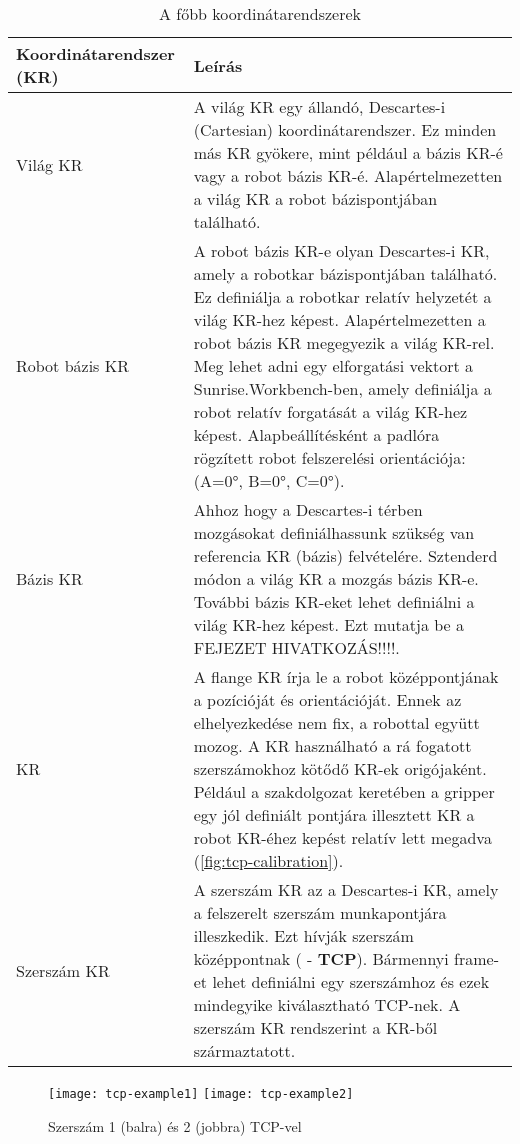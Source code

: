 \documentclass[../documentation.tex]{subfiles}
\begin{document}
\begin{table}[h]
\setlength\arrayrulewidth{1pt}
\begin{tabu} to\linewidth{| X[1.4,c,m] | X[3,l,m] |}
\hline
\rowfont{\bfseries\large} Koordinátarendszer (KR) & Leírás \\ \hline
Világ KR & A világ KR egy állandó, Descartes-i (Cartesian) koordinátarendszer. Ez minden más KR gyökere, mint például a bázis KR-é vagy a robot bázis KR-é. Alapértelmezetten a világ KR a robot bázispontjában található. \\ \hline
Robot bázis KR & A robot bázis KR-e olyan Descartes-i KR, amely a robotkar bázispontjában található. Ez definiálja a robotkar relatív helyzetét a világ KR-hez képest. Alapértelmezetten a robot bázis KR megegyezik a világ KR-rel. Meg lehet adni egy elforgatási vektort a Sunrise.Workbench-ben, amely definiálja a robot relatív forgatását a világ KR-hez képest. Alapbeállítésként a padlóra rögzített robot felszerelési orientációja: (A=0°, B=0°, C=0°).\\ \hline
Bázis KR & Ahhoz hogy a Descartes-i térben mozgásokat definiálhassunk szükség van referencia KR (bázis) felvételére. Sztenderd módon a világ KR a mozgás bázis KR-e. További bázis KR-eket lehet definiálni a világ KR-hez képest. Ezt mutatja be a FEJEZET HIVATKOZÁS!!!!. \\ \hline
{} KR & A flange KR írja le a robot  középpontjának a pozícióját és orientációját. Ennek az elhelyezkedése nem fix, a robottal együtt mozog. A  KR használható a rá fogatott szerszámokhoz kötődő KR-ek origójaként. Például a szakdolgozat keretében a gripper egy jól definiált pontjára illesztett KR a robot  KR-éhez kepést relatív lett megadva (\ref{fig:tcp-calibration}). \\ \hline
Szerszám KR & A szerszám KR az a Descartes-i KR, amely a felszerelt szerszám munkapontjára illeszkedik. Ezt hívják szerszám középpontnak ( - \textbf{TCP}). Bármennyi frame-et lehet definiálni egy szerszámhoz és ezek mindegyike kiválasztható TCP-nek. A szerszám KR rendszerint a  KR-ből származtatott. \\ \hline
\end{tabu}
\caption{A főbb koordinátarendszerek}
\label{tab:coordsystems}
\end{table}

\begin{figure}[h]
	\centering
	\texttt{[image: tcp-example1]}
	\texttt{[image: tcp-example2]}
	\caption{Szerszám 1 (balra) és 2 (jobbra) TCP-vel\cite{sunrisemanual}}
	\label{fig:tcp-examples}
\end{figure}
\end{document}

